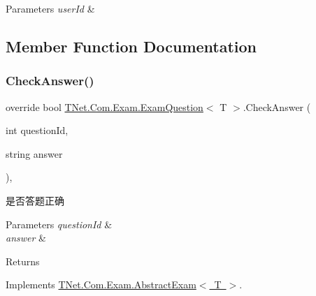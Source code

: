 \begin{DoxyParams}{Parameters}
{\em user\+Id} & \\
\hline
\end{DoxyParams}


\subsection{Member Function Documentation}
\mbox{\label{class_t_net_1_1_com_1_1_exam_1_1_exam_question_acda26f165e3790cb094ee63d4c1d9cf5}} 
\subsubsection{\texorpdfstring{Check\+Answer()}{CheckAnswer()}}
{\footnotesize\ttfamily override bool \mbox{\hyperlink{class_t_net_1_1_com_1_1_exam_1_1_exam_question}{T\+Net.\+Com.\+Exam.\+Exam\+Question}}$<$ T $>$.Check\+Answer (\begin{DoxyParamCaption}\item[{int}]{question\+Id,  }\item[{string}]{answer }\end{DoxyParamCaption})\hspace{0.3cm}{\ttfamily [protected]}, {\ttfamily [virtual]}}



是否答题正确 


\begin{DoxyParams}{Parameters}
{\em question\+Id} & \\
\hline
{\em answer} & \\
\hline
\end{DoxyParams}
\begin{DoxyReturn}{Returns}

\end{DoxyReturn}


Implements \mbox{\hyperlink{class_t_net_1_1_com_1_1_exam_1_1_abstract_exam_a98039563cff59a78dd2f9bb3d1036123}{T\+Net.\+Com.\+Exam.\+Abstract\+Exam$<$ T $>$}}.

\mbox{\label{class_t_net_1_1_com_1_1_exam_1_1_exam_question_a52cc7c3b0257b8a9ee5a9e9de4880ef2}} 
